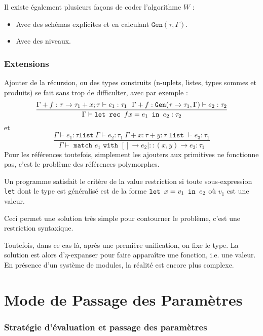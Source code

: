 \documentclass{cours}
\begin{document}
Il existe également plusieurs façons de coder l'algorithme $W$ :
\begin{itemize}
    \item Avec des schémas explicites et en calculant $\texttt{Gen}(\tau, \Gamma)$.
    \item Avec des niveaux.
\end{itemize}

\section{Extensions}
Ajouter de la récursion, ou des types construits (n-uplets, listes, types sommes et produits) se fait sans trop de difficulter, avec par exemple :
\[
    \frac{\Gamma + f : \tau \rightarrow \tau_{1} + x ; \tau \vdash e_{1} : \tau_{1} \ \ \Gamma + f : \texttt{Gen}(\tau \rightarrow \tau_{1}, \Gamma) \vdash e_{2} : \tau_{2}}{\Gamma \vdash \texttt{let } \texttt{rec } f x = e_{1} \texttt{ in } e_{2} : \tau_{2}}
\]
et
\[
    \frac{\Gamma \vdash e_{1} : \tau \texttt{list} \ \Gamma \vdash e_{2} : \tau_{1} \ \Gamma + x : \tau + y : \tau \texttt{ list } \vdash e_{3} : \tau_{1}}{\Gamma \vdash \texttt{ match } e_{1} \texttt{ with } \left[\right] \rightarrow e_{2} \mid ::(x, y) \rightarrow e_{3} : \tau_{1}}
\]
Pour les références toutefois, simplement les ajouters aux primitives ne fonctionne pas, c'est le problème des références polymorphes.

\begin{definition}
    Un programme satisfait le critère de la value restriction si toute sous-expression \texttt{let} dont le type est généralisé est de la forme $\texttt{let } x = v_{1} \texttt{ in } e_{2}$ où $v_{1}$ est une valeur.
\end{definition}
Ceci permet une solution très simple pour contourner le problème, c'est une restriction syntaxique.

Toutefois, dans ce cas là, après une première unification, on fixe le type. La solution est alors d'$\eta$-expanser pour faire apparaître une fonction, i.e. une valeur. En présence d'un système de modules, la réalité est encore plus complexe.


\part{Mode de Passage des Paramètres}
\section{Stratégie d'évaluation et passage des paramètres}
\end{document}
